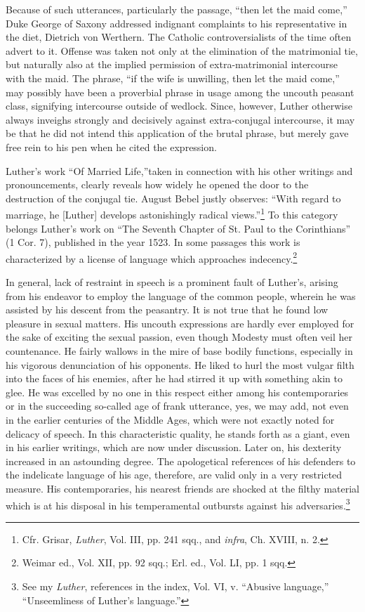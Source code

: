 Because of such utterances, particularly the passage, ``then let the maid
come,'' Duke George of Saxony addressed indignant complaints to his representative
in the diet, Dietrich von Werthern. The Catholic controversialists of
the time often advert to it. Offense was taken not only at the elimination
of the matrimonial tie, but naturally also at the implied permission of
extra-matrimonial intercourse with the maid. The phrase, ``if the wife
is unwilling, then let the maid come,'' may possibly have been a proverbial
phrase in usage among the uncouth peasant class, signifying intercourse
outside of wedlock. Since, however, Luther otherwise always inveighs strongly
and decisively against extra-conjugal intercourse, it may be that he did
not intend this application of the brutal phrase, but merely gave free
rein to his pen when he cited the expression.

Luther's work ``Of Married Life,''taken in connection with his other writings
and pronouncements, clearly reveals how widely he opened the door to the
destruction of the conjugal tie. August Bebel justly observes: ``With regard
to marriage, he [Luther] develops astonishingly radical views.''\footnote
{Cfr. Grisar, \textit{Luther}, Vol. III, pp. 241 sqq., and \textit{infra}, Ch. XVIII, n. 2.}
To this category belongs Luther's work on ``The Seventh Chapter of St. Paul
to the Corinthians'' (1 Cor. 7), published in the year 1523. In some
passages this work is characterized by a license of language which approaches
indecency.\footnote{Weimar ed., Vol. XII, pp. 92 sqq.; Erl. ed., Vol. LI, pp. 1 sqq.}

In general, lack of restraint in speech is a prominent fault
of Luther's, arising from his endeavor to employ the language of the common
people, wherein he was assisted by his descent from the peasantry. It
is not true that he found low pleasure in sexual matters. His uncouth
expressions are hardly ever employed for the sake of exciting the sexual
passion, even though Modesty must often veil her countenance. He fairly
wallows in the mire of base bodily
functions, especially in his vigorous denunciation of his opponents.
He liked to hurl the most vulgar filth into the faces of his enemies,
after he had stirred it up with something akin to glee. He was excelled
by no one in this respect either among his contemporaries
or in the succeeding so-called age of frank utterance, yes, we may
add, not even in the earlier centuries of the Middle Ages, which
were not exactly noted for delicacy of speech. In this characteristic
quality, he stands forth as a giant, even in his earlier writings, which
are now under discussion. Later on, his dexterity increased in an
astounding degree. The apologetical references of his defenders to
the indelicate language of his age, therefore, are valid only in a
very restricted measure. His contemporaries, his nearest friends
are shocked at the filthy material which is at his disposal in his temperamental
outbursts against his adversaries.\footnote
{See my \textit{Luther}, references in the index, Vol. VI, v. ``Abusive language,'' ``Unseemliness
of Luther's language.'' }

